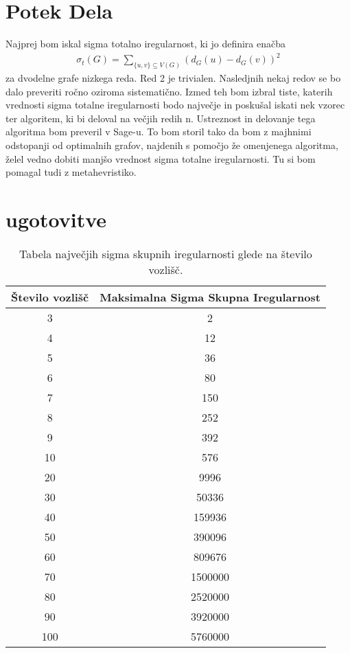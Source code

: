 \documentclass[12pt,a4paper]{amsart}
\theoremstyle{definition} %
\theoremstyle{plain} %
\begin{document}
\section{Potek Dela}
Najprej bom iskal sigma totalno iregularnost, ki jo definira enačba
\begin{align}
    \sigma_t(G) = \sum_{\{u,v\} \subseteq V(G)} (d_G(u) - d_G(v))^2
\end{align}
za dvodelne grafe nizkega reda. Red 2 je trivialen. Nasledjnih nekaj redov se bo dalo preveriti ročno oziroma sistematično.
Izmed teh bom izbral tiste, katerih vrednosti sigma totalne iregularnosti bodo največje in poskušal iskati nek vzorec
ter algoritem, ki bi deloval na večjih redih n. Ustreznost in delovanje tega algoritma bom preveril v Sage-u.
To bom storil tako da bom z majhnimi odstopanji od optimalnih grafov, najdenih s pomočjo že omenjenega
algoritma, želel vedno dobiti manjšo vrednost sigma totalne iregularnosti. Tu si bom pomagal tudi z metahevristiko.

\section{ugotovitve}


\begin{table}[h]
    \centering
    \begin{tabular}{|c|c|}
        \hline
        \textbf{Število vozlišč} & \textbf{Maksimalna Sigma Skupna Iregularnost} \\
        \hline
        3 & 2 \\
        4 & 12 \\
        5 & 36 \\
        6 & 80 \\
        7 & 150 \\
        8 & 252 \\
        9 & 392 \\
        10 & 576 \\
        20 & 9996 \\
        30 & 50336 \\
        40 & 159936 \\
        50 & 390096 \\
        60 & 809676 \\
        70 & 1500000 \\
        80 & 2520000 \\
        90 & 3920000 \\
        100 & 5760000 \\
        \hline
    \end{tabular}
    \caption{Tabela največjih sigma skupnih iregularnosti glede na število vozlišč.}
    \label{tab:tabela_sigma_skupnih}
\end{table}
\end{document}
